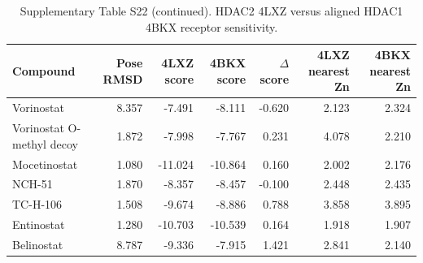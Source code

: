 \begin{table}[H]
\centering
\caption*{Supplementary Table S22 (continued). HDAC2 4LXZ versus aligned HDAC1 4BKX receptor sensitivity.}
\begin{tabular}{@{}lrrrrrr@{}}
\toprule
Compound & Pose RMSD & 4LXZ score & 4BKX score & $\Delta$ score & 4LXZ nearest Zn & 4BKX nearest Zn \\
\midrule
Vorinostat & 8.357 & -7.491 & -8.111 & -0.620 & 2.123 & 2.324 \\
Vorinostat O-methyl decoy & 1.872 & -7.998 & -7.767 & 0.231 & 4.078 & 2.210 \\
Mocetinostat & 1.080 & -11.024 & -10.864 & 0.160 & 2.002 & 2.176 \\
NCH-51 & 1.870 & -8.357 & -8.457 & -0.100 & 2.448 & 2.435 \\
TC-H-106 & 1.508 & -9.674 & -8.886 & 0.788 & 3.858 & 3.895 \\
Entinostat & 1.280 & -10.703 & -10.539 & 0.164 & 1.918 & 1.907 \\
Belinostat & 8.787 & -9.336 & -7.915 & 1.421 & 2.841 & 2.140 \\
\bottomrule
\end{tabular}
\end{table}
\endgroup
